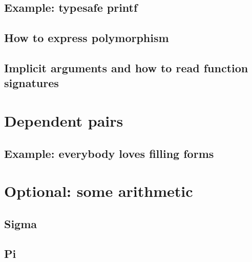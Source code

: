 \documentclass{beamer}
\begin{document}
\subsection{Example: typesafe printf}

\subsection{How to express polymorphism}

\subsection{Implicit arguments and how to read function signatures}

\section{Dependent pairs}

\subsection{Example: everybody loves filling forms}

\section{Optional: some arithmetic}

\subsection{Sigma}

\subsection{Pi}
\end{document}
